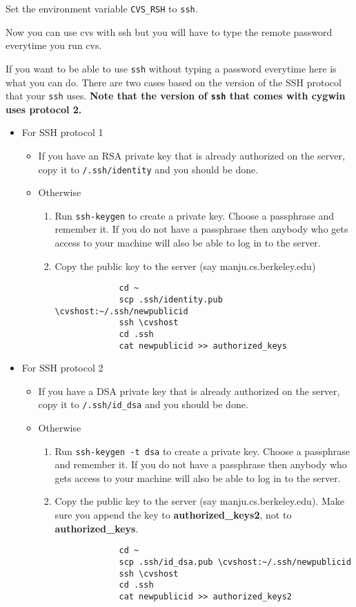 \documentclass{article}
\def\t#1{{\tt #1}}
\def\cvshost{manju}
\begin{document}
 Set the environment variable \t{CVS\_RSH} to \t{ssh}. 

 Now you can use cvs with ssh but you will have to type the remote password
 everytime you run cvs. 

 If you want to be able to use \t{ssh} without typing a password everytime
here is what you can do. There are two cases based on the version of the SSH
protocol that your \t{ssh} uses. {\bf Note that the version of \t{ssh} that
comes with cygwin uses protocol 2.}

\begin{itemize}
\item For SSH protocol 1
  \begin{itemize}
  \item If you have an RSA private key that is already authorized on 
        the server, copy it to \t{\home{}/.ssh/identity} and you 
        should be done.
  \item Otherwise
     \begin{enumerate}
       \item Run \t{ssh-keygen} to create a private key. 
        Choose a passphrase and
        remember it. If you do not have a passphrase then anybody who gets
        access to your machine will also be able to log in to the server.
       \item Copy the public key to the server (say \cvshost.cs.berkeley.edu)
             \begin{verbatim}
             cd ~
             scp .ssh/identity.pub \cvshost:~/.ssh/newpublicid
             ssh \cvshost
             cd .ssh
             cat newpublicid >> authorized_keys
             \end{verbatim}
    \end{enumerate}
  \end{itemize}
 
\item For SSH protocol 2

  \begin{itemize}
  \item If you have a DSA private key that is already authorized on 
        the server, copy it to \t{\home{}/.ssh/id\_dsa} and you 
        should be done.
  \item Otherwise
     \begin{enumerate}
       \item Run \t{ssh-keygen -t dsa} to create a private key. 
        Choose a passphrase and remember it. 
        If you do not have a passphrase then anybody who gets
        access to your machine will also be able to log in to the server.
       \item Copy the public key to the server (say \cvshost.cs.berkeley.edu).
          Make sure you append the key to {\bf authorized\_keys2}, not to {\bf
          authorized\_keys}.  
             \begin{verbatim}
             cd ~
             scp .ssh/id_dsa.pub \cvshost:~/.ssh/newpublicid
             ssh \cvshost
             cd .ssh
             cat newpublicid >> authorized_keys2
             \end{verbatim}
     \end{enumerate}
  \end{itemize}



\end{itemize}
\end{document}
